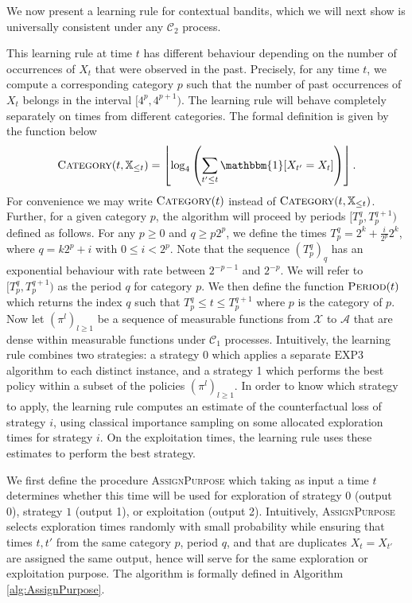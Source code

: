 \documentclass[aos]{imsart}
\theoremstyle{plain}
\theoremstyle{remark}
\newcommand{\Acal}{\mathcal{A}}
\newcommand{\Ccal}{\mathcal{C}}
\newcommand{\Xcal}{\mathcal{X}}
\newcommand{\Xbb}{\mathbb{X}}
\newcommand{\1}{\mathbbm{1}}%
\newcommand{\EXP}{\mathrm{EXP3}}
\begin{document}
We now present a learning rule for contextual bandits, which we will next show is universally consistent under any $\Ccal_2$ process.


This learning rule at time $t$ has different behaviour depending on the number of occurrences of $X_t$ that were observed in the past. Precisely, for any time $t$, we compute a corresponding category $p$ such that the number of past occurrences of $X_t$ belongs in the interval $[4^p,4^{p+1})$. The learning rule will behave completely separately on times from different categories. The formal definition is given by the function below
\begin{equation*}
    \textsc{Category}(t,\Xbb_{\leq t}) = \left\lfloor \log_4\left(\sum_{t'\leq t} \1[X_{t'}=X_t]\right)\right\rfloor.
\end{equation*}
For convenience we may write $\textsc{Category}(t)$ instead of $\textsc{Category}(t,\Xbb_{\leq t})$. Further, for a given category $p$, the algorithm will proceed by periods $[T_p^q,T_p^{q+1})$ defined as follows. For any $p\geq 0$ and $q\geq p2^p$, we define the times $T_p^q = 2^k + \frac{i}{2^p}2^k$, where $q = k 2^p + i$ with $0\leq i<2^p$. Note that the sequence $(T_p^q)_q$ has an exponential behaviour with rate between $2^{-p-1}$ and $2^{-p}$. We will refer to $[T_p^q,T_p^{q+1})$ as the period $q$ for category $p$. We then define the function $\textsc{Period}(t)$ which returns the index $q$ such that $T_p^q\leq t\leq T_p^{q+1}$ where $p$ is the category of $p$. Now let $(\pi^l)_{l\geq 1}$ be a sequence of measurable functions from $\Xcal$ to $\Acal$ that are dense within measurable functions under $\Ccal_1$ processes. Intuitively, the learning rule combines two strategies: a strategy 0 which applies a separate $\EXP$ algorithm to each distinct instance, and a strategy 1 which performs the best policy within a subset of the policies $(\pi^l)_{l\geq 1}$. In order to know which strategy to apply, the learning rule computes an estimate of the counterfactual loss of strategy $i$, using classical importance sampling on some allocated exploration times for strategy $i$. On the exploitation times, the learning rule uses these estimates to perform the best strategy. 

We first define the procedure \textsc{AssignPurpose} which taking as input a time $t$ determines whether this time will be used for exploration of strategy $0$ (output 0), strategy $1$ (output 1), or exploitation (output 2). Intuitively, \textsc{AssignPurpose} selects exploration times randomly with small probability while ensuring that times $t,t'$ from the same category $p$, period $q$, and that are duplicates $X_t=X_{t'}$ are assigned the same output, hence will serve for the same exploration or exploitation purpose. The algorithm is formally defined in Algorithm \ref{alg:AssignPurpose}. 
\end{document}
